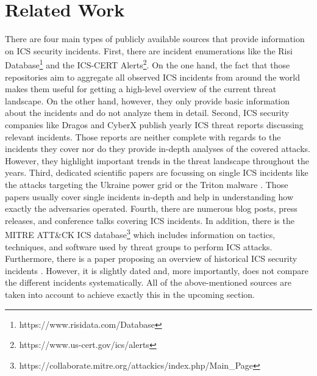 \documentclass[runningheads]{llncs}
\begin{document}
\section{Related Work}
There are four main types of publicly available sources that provide information on ICS security incidents.
First, there are incident enumerations like the Risi Database\footnote{https://www.risidata.com/Database} and the ICS-CERT Alerts\footnote{https://www.us-cert.gov/ics/alerts}.
On the one hand, the fact that those repositories aim to aggregate all observed ICS incidents from around the world makes them useful for getting a high-level overview of the current threat landscape.
On the other hand, however, they only provide basic information about the incidents and do not analyze them in detail.
Second, ICS security companies like Dragos \cite{dragos.19} and CyberX \cite{cyberx.19} publish yearly ICS threat reports discussing relevant incidents.
Those reports are neither complete with regards to the incidents they cover nor do they provide in-depth analyses of the covered attacks.
However, they highlight important trends in the threat landscape throughout the years.
Third, dedicated scientific papers are focussing on single ICS incidents like the attacks targeting the Ukraine power grid \cite{eisac.16} or the Triton malware \cite{pinto.18}. Those papers usually cover single incidents in-depth and help in understanding how exactly the adversaries operated.
Fourth, there are numerous blog posts, press releases, and conference talks covering ICS incidents.
In addition, there is the MITRE ATT\&CK ICS database\footnote{https://collaborate.mitre.org/attackics/index.php/Main\_Page} which includes information on tactics, techniques, and software used by threat groups to perform ICS attacks.
Furthermore, there is a paper proposing an overview of historical ICS security incidents \cite{hemsley.18}.
However, it is slightly dated and, more importantly, does not compare the different incidents systematically.
All of the above-mentioned sources are taken into account to achieve exactly this in the upcoming section.
\end{document}
